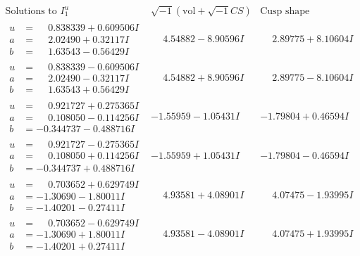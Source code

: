 \documentclass[1p]{elsarticle_modified}
\theoremstyle{definition}
\newcommand{\I}{\sqrt{-1}}
\begin{document}
$$\begin{array}{c|c|c}  
\text{Solutions to }I^u_{1}& \I (\text{vol} + \sqrt{-1}CS) & \text{Cusp shape}\\
 \hline 
\begin{aligned}
u &= \phantom{-}0.838339 + 0.609506 I \\
a &= \phantom{-}2.02490 + 0.32117 I \\
b &= \phantom{-}1.63543 - 0.56429 I\end{aligned}
 & \phantom{-}4.54882 - 8.90596 I & \phantom{-}2.89775 + 8.10604 I \\ \hline\begin{aligned}
u &= \phantom{-}0.838339 - 0.609506 I \\
a &= \phantom{-}2.02490 - 0.32117 I \\
b &= \phantom{-}1.63543 + 0.56429 I\end{aligned}
 & \phantom{-}4.54882 + 8.90596 I & \phantom{-}2.89775 - 8.10604 I \\ \hline\begin{aligned}
u &= \phantom{-}0.921727 + 0.275365 I \\
a &= \phantom{-}0.108050 - 0.114256 I \\
b &= -0.344737 - 0.488716 I\end{aligned}
 & -1.55959 - 1.05431 I & -1.79804 + 0.46594 I \\ \hline\begin{aligned}
u &= \phantom{-}0.921727 - 0.275365 I \\
a &= \phantom{-}0.108050 + 0.114256 I \\
b &= -0.344737 + 0.488716 I\end{aligned}
 & -1.55959 + 1.05431 I & -1.79804 - 0.46594 I \\ \hline\begin{aligned}
u &= \phantom{-}0.703652 + 0.629749 I \\
a &= -1.30690 - 1.80011 I \\
b &= -1.40201 - 0.27411 I\end{aligned}
 & \phantom{-}4.93581 + 4.08901 I & \phantom{-}4.07475 - 1.93995 I \\ \hline\begin{aligned}
u &= \phantom{-}0.703652 - 0.629749 I \\
a &= -1.30690 + 1.80011 I \\
b &= -1.40201 + 0.27411 I\end{aligned}
 & \phantom{-}4.93581 - 4.08901 I & \phantom{-}4.07475 + 1.93995 I \\ \hline\begin{aligned}

\end{aligned}
\end{array}$$
\end{document}
